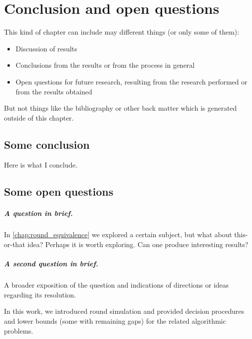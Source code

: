 \chapter{Conclusion and open questions}
\label{chap:conclusion}
\label{chap:discussion}
\label{chap:future}

This kind of chapter can include may different things (or only some of them):
\begin{itemize}
\item Discussion of results
\item Conclusions from the results or from the process in general
\item Open questions for future research, resulting from the research performed or from the results obtained
\end{itemize}

But not things like the bibliography or other back matter which is generated outside of this chapter.


\section{Some conclusion}

Here is what I conclude.

\section{Some open questions}

\paragraph{A question in brief.} In \autoref{chap:round_equivalence} we explored a certain subject, but what about this-or-that idea? Perhaps it is worth exploring. Can one produce interesting results?

\paragraph{A second question in brief.} A broader exposition of the question and indications of directions or ideas regarding its resolution.

In this work, we introduced round simulation and provided decision procedures and lower bounds (some with remaining gaps) for the related algorithmic problems.

